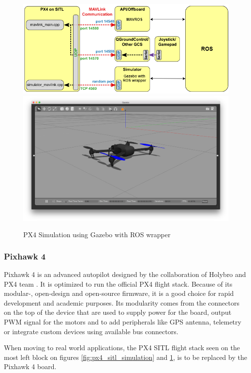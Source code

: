 \begin{figure}[h]
    \centering
    \includegraphics[width=140mm, keepaspectratio]{figures/px4_sitl_with_ros.png}
    \includegraphics[width=140mm]{figures/iris_gazebo.png}
    \caption{PX4 Simulation using Gazebo with ROS wrapper}
    \label{fig:px4_sitl_ros_wrapper}
\end{figure}

\subsubsection{Pixhawk 4}
Pixhawk 4 is an advanced autopilot designed by the collaboration of Holybro and PX4 team \cite{Pixhawk4Website}. 
It is optimized to run the official PX4 flight stack. Because of its modular-, open-design and open-source 
firmware, it is a good choice for rapid development and academic purposes. Its modularity comes from the 
connectors on the top of the device that are used to supply power for the board, output PWM signal for 
the motors and to add peripherals like GPS antenna, telemetry or integrate custom devices using available
bus connectors. 

When moving to real world applications, the PX4 SITL flight stack seen on the most left block on figures
\ref{fig:px4_sitl_simulation} and \ref{fig:px4_sitl_ros_wrapper}, is to be replaced by the Pixhawk 4 board.

